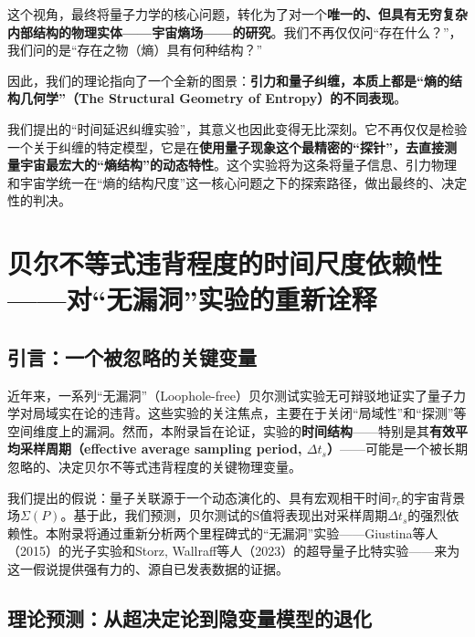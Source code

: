 \documentclass[12pt]{article}
\begin{document}
\noindent 这个视角，最终将量子力学的核心问题，转化为了对一个\textbf{唯一的、但具有无穷复杂内部结构的物理实体——宇宙熵场——的研究}。我们不再仅仅问``存在什么？''，我们问的是``存在之物（熵）具有何种结构？''

\noindent 因此，我们的理论指向了一个全新的图景：\textbf{引力和量子纠缠，本质上都是``熵的结构几何学''（The Structural Geometry of Entropy）的不同表现}。

\noindent 我们提出的``时间延迟纠缠实验''，其意义也因此变得无比深刻。它不再仅仅是检验一个关于纠缠的特定模型，它是在\textbf{使用量子现象这个最精密的``探针''，去直接测量宇宙最宏大的``熵结构''的动态特性}。这个实验将为这条将量子信息、引力物理和宇宙学统一在``熵的结构尺度''这一核心问题之下的探索路径，做出最终的、决定性的判决。



\newpage
\appendix %
\renewcommand{\thesection}{\Alph{section}} %
\setcounter{section}{23} %

\section{贝尔不等式违背程度的时间尺度依赖性——对``无漏洞''实验的重新诠释}

\subsection{引言：一个被忽略的关键变量}

近年来，一系列``无漏洞''（Loophole-free）贝尔测试实验无可辩驳地证实了量子力学对局域实在论的违背。这些实验的关注焦点，主要在于关闭``局域性''和``探测''等空间维度上的漏洞。然而，本附录旨在论证，实验的\textbf{时间结构}——特别是其\textbf{有效平均采样周期（effective average sampling period, $\Delta t_s$）}——可能是一个被长期忽略的、决定贝尔不等式违背程度的关键物理变量。

我们提出的假说：量子关联源于一个动态演化的、具有宏观相干时间$\tau_c$的宇宙背景场$\Sigma(P)$。基于此，我们预测，贝尔测试的S值将表现出对采样周期$\Delta t_s$的强烈依赖性。本附录将通过重新分析两个里程碑式的``无漏洞''实验——Giustina等人（2015）的光子实验和Storz, Wallraff等人（2023）的超导量子比特实验——来为这一假说提供强有力的、源自已发表数据的证据。

\subsection{理论预测：从超决定论到隐变量模型的退化}
\end{document}
